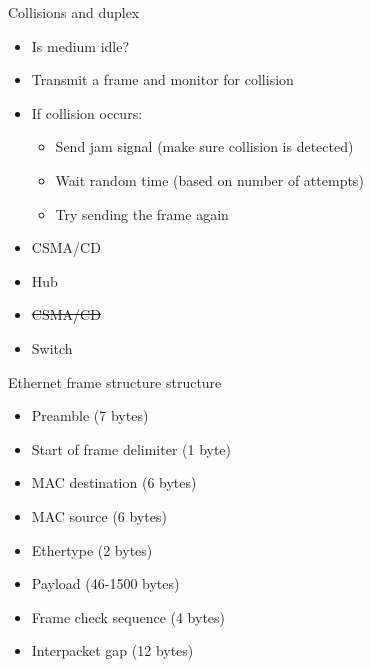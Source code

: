 \begin{frame}{Collisions and duplex}
	\pause
	\begin{itemize}[<+->]
		\item Is medium idle?
		\item Transmit a frame and monitor for collision
		\item If collision occurs:
		\begin{itemize}
			\item Send jam signal (make sure collision is detected)
			\item Wait random time (based on number of attempts)
			\item Try sending the frame again
		\end{itemize}
	\end{itemize}
	\pause
	\begin{itemize}[<+->]
		\item CSMA/CD
		\item Hub
	\end{itemize}
	\pause
	\begin{itemize}[<+->]
		\item \sout{CSMA/CD}
		\item Switch
	\end{itemize}
\end{frame}

\begin{frame}{Ethernet frame structure}
	 structure\pause
	\begin{itemize}[<+->]
		\item Preamble (7 bytes)
		\item Start of frame delimiter (1 byte)
		\item MAC destination (6 bytes)
		\item MAC source (6 bytes)
		\item Ethertype (2 bytes)
		\item Payload (46-1500 bytes)
		\item Frame check sequence (4 bytes)
		\item Interpacket gap (12 bytes)
	\end{itemize}
\end{frame}

